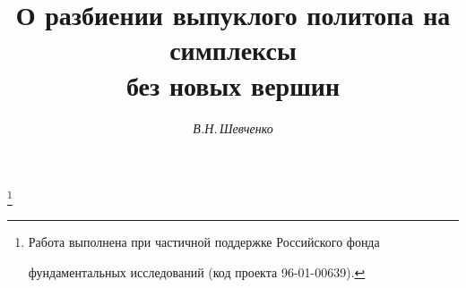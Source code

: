 









\newcommand{\Conv}{\operatorname{Conv}}


\newcommand{\aff}{{\series{m}\shape{n}\selectfont\text{\,aff\,}}}


\newcommand{\Int}{\operatorname{int}}


\newcommand{\tts}[1]{}


\renewcommand{\baselinestretch}{1.05}










\setcounter{page}{89}












\author{\it В.Н.\,Шевченко}


\title{О разбиении выпуклого политопа на симплексы\\


без новых вершин}





\thanks{Работа выполнена при частичной поддержке Российского фонда


фундаментальных исследований (код проекта 96-01-00639).}


\date{}







\pagestyle{plain} %








